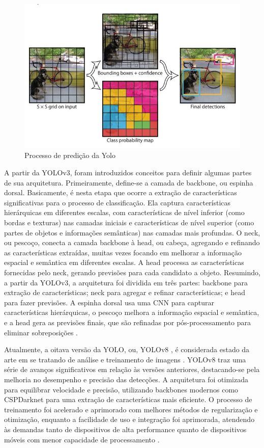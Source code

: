 \begin{figure}[!h]
    \center
    \begin{minipage}{0.9\linewidth}
    \center
    \captionsetup{justification=centering,margin=0.5cm,font=small}
    \includegraphics[width=0.7\linewidth]{img/cap2/processo-predicao-YOLO.jpeg}
    \caption{ Processo de predição da Yolo \cite{redmon2016youlookonce}} \label{fig:yolo}
    \end{minipage}
\end{figure}
A partir da YOLOv3, foram introduzidos conceitos para definir algumas partes de sua arquitetura. Primeiramente, define-se a camada de backbone, ou espinha dorsal. Basicamente, é nesta etapa que ocorre a extração de características significativas para o processo de classificação. Ela captura características hierárquicas em diferentes escalas, com características de nível inferior (como bordas e texturas) nas camadas iniciais e características de nível superior (como partes de objetos e informações semânticas) nas camadas mais profundas. O neck, ou pescoço, conecta a camada backbone à head, ou cabeça, agregando e refinando as características extraídas, muitas vezes focando em melhorar a informação espacial e semântica em diferentes escalas. A head processa as características fornecidas pelo neck, gerando previsões para cada candidato a objeto. Resumindo, a partir da YOLOv3, a arquitetura foi dividida em três partes: backbone para extração de características; neck para agregar e refinar características; e head para fazer previsões. A espinha dorsal usa uma CNN para capturar características hierárquicas, o pescoço melhora a informação espacial e semântica, e a head gera as previsões finais, que são refinadas por pós-processamento para eliminar sobreposições \cite{terven2023comprehensive}.

Atualmente, a oitava versão da YOLO, ou, YOLOv8 , é considerada estado da arte em se tratando de análise e treinamento de imagens \cite{ultralytics2024}. YOLOv8 traz uma série de avanços significativos em relação às versões anteriores, destacando-se pela melhoria no desempenho e precisão das detecções. A arquitetura foi otimizada para equilibrar velocidade e precisão, utilizando backbones modernos como CSPDarknet para uma extração de características mais eficiente. O processo de treinamento foi acelerado e aprimorado com melhores métodos de regularização e otimização, enquanto a facilidade de uso e integração foi aprimorada, atendendo às demandas tanto de dispositivos de alta performance quanto de dispositivos móveis com menor capacidade de processamento \cite{hussain2023yolo}.


